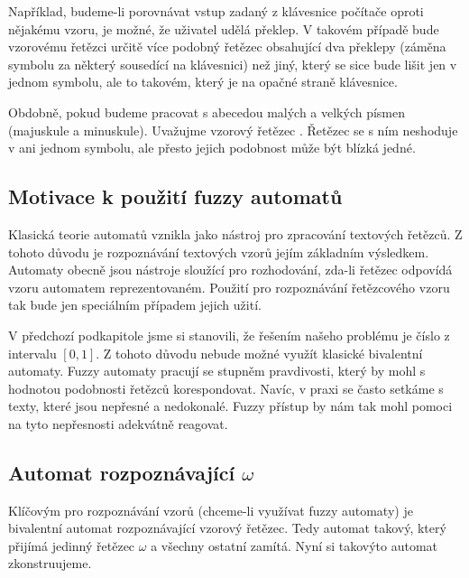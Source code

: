 \documentclass[a4paper,10pt]{article}
\begin{document}
Například, budeme-li porovnávat vstup zadaný z klávesnice počítače oproti nějakému vzoru, je možné, že uživatel udělá překlep. V takovém případě bude vzorovému řetězci určitě více podobný řetězec obsahující dva překlepy (záměna symbolu za některý sousedící na klávesnici) než jiný, který se sice bude lišit jen v jednom symbolu, ale to takovém, který je na opačné straně klávesnice.

Obdobně, pokud budeme pracovat s abecedou malých a velkých písmen (majuskule a minuskule). Uvažujme vzorový řetězec . Řetězec  se s ním neshoduje v ani jednom symbolu, ale přesto jejich podobnost může být blízká jedné.


\subsection{Motivace k použití fuzzy automatů}
Klasická teorie automatů vznikla jako nástroj pro zpracování textových řetězců. Z tohoto důvodu je rozpoznávání textových vzorů jejím základním výsledkem. Automaty obecně jsou nástroje sloužící pro rozhodování, zda-li řetězec odpovídá vzoru automatem reprezentovaném. Použití pro rozpoznávání řetězcového vzoru tak bude jen speciálním případem jejich užití.

V předchozí podkapitole jsme si stanovili, že řešením našeho problému je číslo z intervalu $[0,1]$. Z tohoto důvodu nebude možné využít klasické bivalentní automaty. Fuzzy automaty pracují se stupněm pravdivosti, který by mohl s hodnotou podobnosti řetězců korespondovat. Navíc, v praxi se často setkáme s texty, které jsou nepřesné a nedokonalé. Fuzzy přístup by nám tak mohl pomoci na tyto nepřesnosti adekvátně reagovat.

\subsection{Automat rozpoznávající $\omega$}
Klíčovým pro rozpoznávání vzorů (chceme-li využívat fuzzy automaty) je bivalentní automat rozpoznávající vzorový řetězec. Tedy automat takový, který přijímá jedinný řetězec $\omega$ a všechny ostatní zamítá. Nyní si takovýto automat zkonstruujeme.
\end{document}
